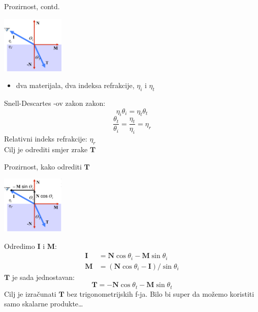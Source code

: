 \documentclass[9pt]{beamer}
\begin{document}
\begin{frame}{Prozirnost, contd.}

\begin{center}
\includegraphics[width=3cm]{slike/prozirnost_02.png}
\end{center}
\begin{itemize}
\item dva materijala, dva indeksa refrakcije, $\eta_i$ i $\eta_t$
\end{itemize}
Snell-Descartes -ov zakon zakon:
$$\eta_i \theta_i = \eta_t \theta_t$$
$$\frac{\theta_t}{\theta_i} = \frac{\eta_t}{\eta_i} = \eta_r$$
Relativni indeks refrakcije: $\eta_r$\\
Cilj je odrediti smjer zrake $\mathbf{T}$
\end{frame}

\begin{frame}{Prozirnost, kako odrediti $\mathbf{T}$}
\begin{center}
\includegraphics[width=3cm]{slike/prozirnost_03.png}
\end{center}
Odredimo $\mathbf{I}$ i $\mathbf{M}$:
\begin{align*}
\mathbf{I} &= \mathbf{N}\cos\theta_i - \mathbf{M}\sin\theta_i \\
\mathbf{M} &= (\mathbf{N}\cos\theta_i - \mathbf{I})/\sin\theta_i
\end{align*}
$\mathbf{T}$ je sada jednostavan:
$$ \mathbf{T} = -\mathbf{N}\cos\theta_t - \mathbf{M}\sin\theta_t $$
Cilj je izračunati $\mathbf{T}$ bez trigonometrijskih f-ja. Bilo bi super da možemo
koristiti samo skalarne produkte\ldots
\end{frame}
\end{document}
